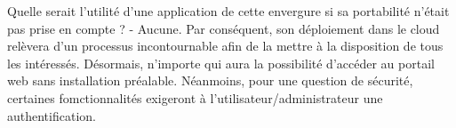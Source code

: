 \par
Quelle serait l'utilité d'une application de cette envergure 
si sa portabilité n'était pas prise en compte ? - Aucune. Par 
conséquent, son déploiement dans le cloud relèvera d'un processus incontournable 
afin de la mettre à la disposition de tous les intéressés. Désormais, 
n'importe qui aura la possibilité d'accéder au portail web sans 
installation préalable. Néanmoins, pour une question de sécurité, 
certaines fomctionnalités exigeront à l'utilisateur/administrateur une authentification.